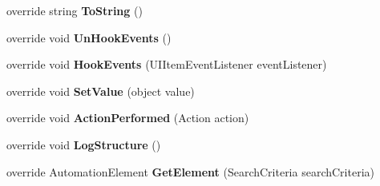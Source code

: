 \begin{DoxyCompactItemize}
\item 
\hypertarget{class_proto_test_1_1_golem_1_1_white_1_1_elements_1_1_white_tool_strip_a421ea398ef460267c6c4a8cb73995254}{override string {\bfseries To\-String} ()}\label{class_proto_test_1_1_golem_1_1_white_1_1_elements_1_1_white_tool_strip_a421ea398ef460267c6c4a8cb73995254}

\item 
\hypertarget{class_proto_test_1_1_golem_1_1_white_1_1_elements_1_1_white_tool_strip_acf9058759a37f7e314cc6e879d5730e0}{override void {\bfseries Un\-Hook\-Events} ()}\label{class_proto_test_1_1_golem_1_1_white_1_1_elements_1_1_white_tool_strip_acf9058759a37f7e314cc6e879d5730e0}

\item 
\hypertarget{class_proto_test_1_1_golem_1_1_white_1_1_elements_1_1_white_tool_strip_a4997abb7f7cea710d02c2bb919a9f87a}{override void {\bfseries Hook\-Events} (U\-I\-Item\-Event\-Listener event\-Listener)}\label{class_proto_test_1_1_golem_1_1_white_1_1_elements_1_1_white_tool_strip_a4997abb7f7cea710d02c2bb919a9f87a}

\item 
\hypertarget{class_proto_test_1_1_golem_1_1_white_1_1_elements_1_1_white_tool_strip_ae82f822b75a08885d8386a50f39a1fde}{override void {\bfseries Set\-Value} (object value)}\label{class_proto_test_1_1_golem_1_1_white_1_1_elements_1_1_white_tool_strip_ae82f822b75a08885d8386a50f39a1fde}

\item 
\hypertarget{class_proto_test_1_1_golem_1_1_white_1_1_elements_1_1_white_tool_strip_a3378f161a3fd74fa7bac0eb05cdba690}{override void {\bfseries Action\-Performed} (Action action)}\label{class_proto_test_1_1_golem_1_1_white_1_1_elements_1_1_white_tool_strip_a3378f161a3fd74fa7bac0eb05cdba690}

\item 
\hypertarget{class_proto_test_1_1_golem_1_1_white_1_1_elements_1_1_white_tool_strip_a64c6cb4dc4d15775c8f0b9e747375f53}{override void {\bfseries Log\-Structure} ()}\label{class_proto_test_1_1_golem_1_1_white_1_1_elements_1_1_white_tool_strip_a64c6cb4dc4d15775c8f0b9e747375f53}

\item 
\hypertarget{class_proto_test_1_1_golem_1_1_white_1_1_elements_1_1_white_tool_strip_a8d70f059fb93ab4332f4d3d11f839cf8}{override Automation\-Element {\bfseries Get\-Element} (Search\-Criteria search\-Criteria)}\label{class_proto_test_1_1_golem_1_1_white_1_1_elements_1_1_white_tool_strip_a8d70f059fb93ab4332f4d3d11f839cf8}


\end{DoxyCompactItemize}
